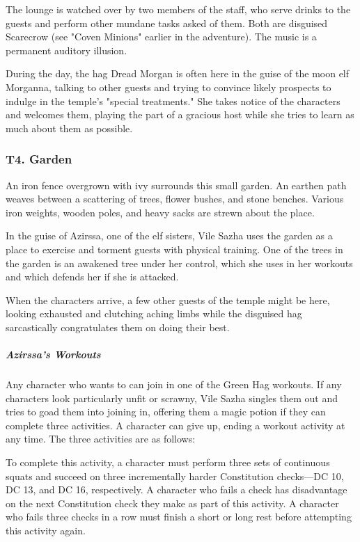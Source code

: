 \documentclass[10pt,a4paper,twoside,bg=print,twocolumn,openany,nodeprecatedcode]{dndbook}
\begin{document}
The lounge is watched over by two members of the staff, who serve drinks to the guests and perform other mundane tasks asked of them. Both are disguised Scarecrow (see "Coven Minions" earlier in the adventure). The music is a permanent auditory illusion.

During the day, the hag Dread Morgan is often here in the guise of the moon elf Morganna, talking to other guests and trying to convince likely prospects to indulge in the temple's "special treatments." She takes notice of the characters and welcomes them, playing the part of a gracious host while she tries to learn as much about them as possible.

\subsubsection{T4. Garden}
\begin{DndReadAloud}{}
An iron fence overgrown with ivy surrounds this small garden. An earthen path weaves between a scattering of trees, flower bushes, and stone benches. Various iron weights, wooden poles, and heavy sacks are strewn about the place.

\end{DndReadAloud}

In the guise of Azirssa, one of the elf sisters, Vile Sazha uses the garden as a place to exercise and torment guests with physical training. One of the trees in the garden is an awakened tree under her control, which she uses in her workouts and which defends her if she is attacked.

When the characters arrive, a few other guests of the temple might be here, looking exhausted and clutching aching limbs while the disguised hag sarcastically congratulates them on doing their best.

\subparagraph{Azirssa's Workouts}
Any character who wants to can join in one of the Green Hag workouts. If any characters look particularly unfit or scrawny, Vile Sazha singles them out and tries to goad them into joining in, offering them a magic potion if they can complete three activities. A character can give up, ending a workout activity at any time. The three activities are as follows:


\begin{description}[nolistsep]
\item[Squats]
To complete this activity, a character must perform three sets of continuous squats and succeed on three incrementally harder Constitution checks—DC 10, DC 13, and DC 16, respectively. A character who fails a check has disadvantage on the next Constitution check they make as part of this activity. A character who fails three checks in a row must finish a short or long rest before attempting this activity again.
\end{description}
\end{document}
